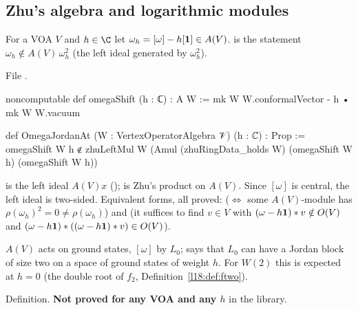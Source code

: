 \subsection{Zhu's algebra and logarithmic modules}

\begin{definition}\label{l18:def:omegaJordan}
For a VOA $V$ and $h\in\C$ let $\omega_h=[\omega]-h[\mathbf{1}]\in A(V)$.  is the statement
$\omega_h\notin A(V)\,\omega_h^2$ (the left ideal generated by $\omega_h^2$).
\end{definition}
\noindent File .
\begin{leancode}
noncomputable def omegaShift (h : ℂ) : A W :=
  mk W W.conformalVector - h • mk W W.vacuum

def OmegaJordanAt (W : VertexOperatorAlgebra 𝒱) (h : ℂ) : Prop :=
  omegaShift W h ∉
    zhuLeftMul W (Amul (zhuRingData_holds W) (omegaShift W h) (omegaShift W h))
\end{leancode}
\begin{dictionary}
 is the left ideal $A(V)x$ ();  is Zhu's product on
$A(V)$. Since $[\omega]$ is central, the left ideal is two-sided. Equivalent forms, all proved:
 ($\iff$ some $A(V)$-module has $\rho(\omega_h)^2=0\ne\rho(\omega_h)$) and
 (it suffices to find $v\in V$ with $(\omega-h\mathbf{1})*v\notin O(V)$ and
$(\omega-h\mathbf{1})*((\omega-h\mathbf{1})*v)\in O(V)$).
\end{dictionary}
\begin{physics}
$A(V)$ acts on ground states, $[\omega]$ by $L_0$;  says that $L_0$ can have a Jordan block of
size two on a space of ground states of weight $h$. For $W(2)$ this is expected at $h=0$ (the double root of
$f_2$, Definition~\ref{l18:def:ftwo}).
\end{physics}
\begin{status}
Definition. \textbf{Not proved for any VOA and any $h$} in the library.
\end{status}

